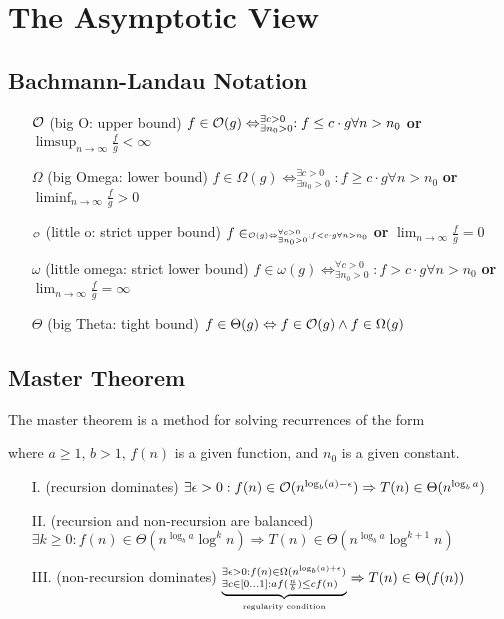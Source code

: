 \documentclass{article}
\author{Leopold Lemmermann}
\begin{document}
\createtitle

\section{The Asymptotic View}
\subsection{Bachmann-Landau Notation}
\begin{itemize}
  \item[$\mathcal{O}$] (big O: upper bound) $f\in \mathcal{O}(g) \Leftrightarrow ^{\exists c > 0}_{\exists n_0 > 0}: f \leq c \cdot g \forall n > n_0$ \textbf{or} $\limsup_{n\to\infty} \frac{f}{g} < \infty$
  \item[$\Omega$] (big Omega: lower bound) $f\in \Omega(g) \Leftrightarrow ^{\exists c > 0}_{\exists n_0 > 0}: f \geq c \cdot g \forall n > n_0$ \textbf{or} $\liminf_{n\to\infty} \frac{f}{g} > 0$
  \item[$\scriptscriptstyle\mathcal{O}$] (little o: strict upper bound) $f\in \scriptscriptstyle\mathcal{O}(g) \Leftrightarrow ^{\forall c > 0}_{\exists n_0 > 0}: f < c \cdot g \forall n > n_0$ \textbf{or} $\lim_{n\to\infty} \frac{f}{g} = 0$
  \item[$\omega$] (little omega: strict lower bound) $f\in \omega(g) \Leftrightarrow ^{\forall c > 0}_{\exists n_0 > 0}: f > c \cdot g \forall n > n_0$ \textbf{or} $\lim_{n\to\infty} \frac{f}{g} = \infty$
  \item[$\Theta$] (big Theta: tight bound) $f\in \Theta(g) \Leftrightarrow f\in \mathcal{O}(g) \land f\in \Omega(g)$
\end{itemize}

\subsection{Master Theorem}
The master theorem is a method for solving recurrences of the form

where $a \geq 1$, $b > 1$, $f(n)$ is a given function, and $n_0$ is a given constant.

\begin{itemize}
  \item[I.] (recursion dominates) $\exists \epsilon > 0: f(n) \in \mathcal{O}(n^{\log_b(a)-\epsilon}) \Rightarrow T(n) \in \Theta(n^{\log_b a})$
  \item[II.] (recursion and non-recursion are balanced) $\exists k \ge 0: f(n) \in \Theta(n^{\log_b a}\log^k n) \Rightarrow T(n) \in \Theta(n^{\log_b a} \log^{k+1} n)$
  \item[III.] (non-recursion dominates) $\underbrace{^{\exists \epsilon > 0: f(n) \in \Omega(n^{\log_b(a)+\epsilon})}_{\exists c \in [0\dots1]: a f(\frac{n}{b}) \leq c f(n)}}_{\text{\tiny regularity condition}} \Rightarrow T(n) \in \Theta(f(n))$
\end{itemize}
\end{document}
